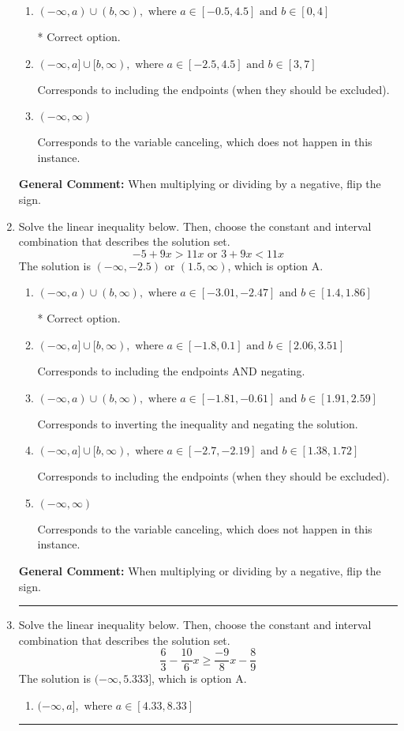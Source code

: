 \documentclass{extbook}[14pt]
\newcommand{\litem}[1]{\item #1

\rule{\textwidth}{0.4pt}}
\begin{document}
\begin{enumerate}
{\begin{enumerate}[label=\Alph*.]
Corresponds to inverting the inequality and negating the solution.
\item \( (-\infty, a) \cup (b, \infty), \text{ where } a \in [-0.5, 4.5] \text{ and } b \in [0, 4] \)

 * Correct option.
\item \( (-\infty, a] \cup [b, \infty), \text{ where } a \in [-2.5, 4.5] \text{ and } b \in [3, 7] \)

Corresponds to including the endpoints (when they should be excluded).
\item \( (-\infty, \infty) \)

Corresponds to the variable canceling, which does not happen in this instance.
\end{enumerate}

\textbf{General Comment:} When multiplying or dividing by a negative, flip the sign.
}
\litem{
Solve the linear inequality below. Then, choose the constant and interval combination that describes the solution set.
\[ -5 + 9 x > 11 x \text{ or } 3 + 9 x < 11 x \]The solution is \( (-\infty, -2.5) \text{ or } (1.5, \infty) \), which is option A.\begin{enumerate}[label=\Alph*.]
\item \( (-\infty, a) \cup (b, \infty), \text{ where } a \in [-3.01, -2.47] \text{ and } b \in [1.4, 1.86] \)

 * Correct option.
\item \( (-\infty, a] \cup [b, \infty), \text{ where } a \in [-1.8, 0.1] \text{ and } b \in [2.06, 3.51] \)

Corresponds to including the endpoints AND negating.
\item \( (-\infty, a) \cup (b, \infty), \text{ where } a \in [-1.81, -0.61] \text{ and } b \in [1.91, 2.59] \)

Corresponds to inverting the inequality and negating the solution.
\item \( (-\infty, a] \cup [b, \infty), \text{ where } a \in [-2.7, -2.19] \text{ and } b \in [1.38, 1.72] \)

Corresponds to including the endpoints (when they should be excluded).
\item \( (-\infty, \infty) \)

Corresponds to the variable canceling, which does not happen in this instance.
\end{enumerate}

\textbf{General Comment:} When multiplying or dividing by a negative, flip the sign.
}
\litem{
Solve the linear inequality below. Then, choose the constant and interval combination that describes the solution set.
\[ \frac{6}{3} - \frac{10}{6} x \geq \frac{-9}{8} x - \frac{8}{9} \]The solution is \( (-\infty, 5.333] \), which is option A.\begin{enumerate}[label=\Alph*.]
\item \( (-\infty, a], \text{ where } a \in [4.33, 8.33] \)


\end{enumerate}}
\end{enumerate}
\end{document}
